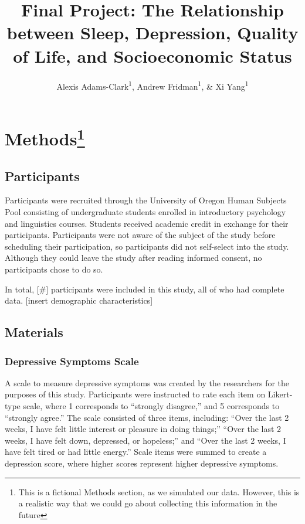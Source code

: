 \documentclass[man]{apa6}
\title{Final Project: The Relationship between Sleep, Depression, Quality of
Life, and Socioeconomic Status}
\author{Alexis Adams-Clark\textsuperscript{1}, Andrew
Fridman\textsuperscript{1}, \& Xi Yang\textsuperscript{1}}
\date{}
\affiliation{
\vspace{0.5cm}
\textsuperscript{1} University of Oregon Department of Psychology}
\let\rmarkdownfootnote\footnote%
\def\footnote{\protect\rmarkdownfootnote}
\begin{document}
\maketitle

\section{\texorpdfstring{Methods\footnote{This is a fictional Methods section, as we simulated our data. However, this is a realistic way that we could go about collecting this information in the future}}{Methods}}\label{methods}

\subsection{Participants}\label{participants}

Participants were recruited through the University of Oregon Human
Subjects Pool consisting of undergraduate students enrolled in
introductory psychology and linguistics courses. Students received
academic credit in exchange for their participants. Participants were
not aware of the subject of the study before scheduling their
participation, so participants did not self-select into the study.
Although they could leave the study after reading informed consent, no
participants chose to do so.

In total, {[}\#{]} participants were included in this study, all of who
had complete data. {[}insert demographic characteristics{]}

\subsection{Materials}\label{materials}

\subsubsection{Depressive Symptoms
Scale}\label{depressive-symptoms-scale}

A scale to measure depressive symptoms was created by the researchers
for the purposes of this study. Participants were instructed to rate
each item on Likert-type scale, where 1 corresponds to \enquote{strongly
disagree,} and 5 corresponds to \enquote{strongly agree.} The scale
consisted of three items, including: \enquote{Over the last 2 weeks, I
have felt little interest or pleasure in doing things;} \enquote{Over
the last 2 weeks, I have felt down, depressed, or hopeless;} and
\enquote{Over the last 2 weeks, I have felt tired or had little energy.}
Scale items were summed to create a depression score, where higher
scores represent higher depressive symptoms.
\end{document}
